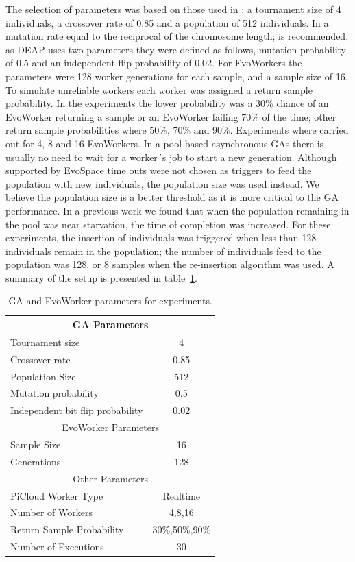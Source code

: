 \documentclass{llncs}
\begin{document}
The selection of parameters was based on those used in \cite{Alba:2002dq}: a
tournament size of 4 individuals, a crossover rate of 0.85 and a
population of 512 individuals. In  \cite{Jong:PS97} a mutation rate
equal to the reciprocal of the chromosome length; is recommended, as
DEAP uses two parameters they were defined as follows, mutation
probability of 0.5 and an independent flip probability of 0.02. For
EvoWorkers the parameters were 128 worker generations for each
sample, and a sample size of 16. To simulate unreliable workers each worker 
was assigned a return sample probability. In the experiments the lower 
probability was a 30\% chance of an EvoWorker returning a sample or
an EvoWorker failing 70\% of the time; other return sample probabilities
where 50\%, 70\% and 90\%. Experiments where carried out for 4, 
8 and 16 EvoWorkers. In a pool based  asynchronous GAs there is usually no need 
to wait for a worker´s job to start a new generation. Although supported by EvoSpace
time outs were not chosen as triggers to feed the population with new
individuals, the population size was used instead. We believe the population
size is a better threshold as it is more critical to the GA performance. 
In a previous work we found that when the population remaining in the pool 
was near starvation, the time of completion was increased. For these 
experiments, the insertion of individuals was triggered when less than 128
individuals remain in the population; the number of individuals feed to the
population was 128, or 8 samples when the re-insertion algorithm
was used. A summary of the setup is presented in table~\ref{params}.

\begin{table}[!t]
\renewcommand{\arraystretch}{1.3}
\caption{GA and EvoWorker parameters for experiments.}
\label{params}
\centering
\begin{tabular}{|l|c|}
\hline
\multicolumn{2}{|c|}{GA Parameters} \\
\hline
Tournament size & 4 \\
Crossover rate & 0.85  \\
Population Size & 512 \\
Mutation probability & 0.5 \\
Independent bit flip probability  & 0.02 \\
\hline
\multicolumn{2}{|c|}{EvoWorker Parameters} \\
\hline
Sample Size & 16 \\
Generations & 128 \\
\hline
\multicolumn{2}{|c|}{Other Parameters} \\
\hline
PiCloud Worker Type & Realtime \\
Number of Workers & 4,8,16 \\
Return Sample Probability & 30\%,50\%,90\% \\
Number of Executions & 30 \\

\hline

\end{tabular}
\end{table}
\end{document}
